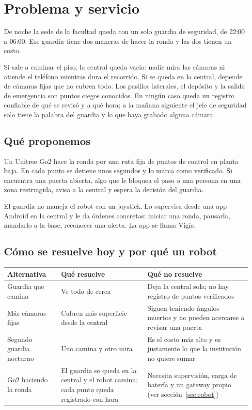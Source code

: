 \section{Problema y servicio}
\label{sec:problema}

De noche la sede de la facultad queda con un solo guardia de seguridad, de 22:00 a 06:00. Ese guardia tiene dos maneras de hacer la ronda y las dos tienen un costo.

Si sale a caminar el piso, la central queda vacía: nadie mira las cámaras ni atiende el teléfono mientras dura el recorrido. Si se queda en la central, depende de cámaras fijas que no cubren todo. Los pasillos laterales, el depósito y la salida de emergencia son puntos ciegos conocidos. En ningún caso queda un registro confiable de qué se revisó y a qué hora; a la mañana siguiente el jefe de seguridad solo tiene la palabra del guardia y lo que haya grabado alguna cámara.

\subsection{Qué proponemos}

Un Unitree Go2 hace la ronda por una ruta fija de puntos de control en planta baja. En cada punto se detiene unos segundos y lo marca como verificado. Si encuentra una puerta abierta, algo que le bloquea el paso o una persona en una zona restringida, avisa a la central y espera la decisión del guardia.

El guardia no maneja el robot con un joystick. Lo supervisa desde una app Android en la central y le da órdenes concretas: iniciar una ronda, pausarla, mandarlo a la base, reconocer una alerta. La app se llama Vigía.

\subsection{Cómo se resuelve hoy y por qué un robot}

\begin{table}[H]
\centering\small
\begin{tabularx}{\textwidth}{@{}l L L@{}}
\toprule
\textbf{Alternativa} & \textbf{Qué resuelve} & \textbf{Qué no resuelve} \\
\midrule
Guardia que camina & Ve todo de cerca & Deja la central sola; no hay registro de puntos verificados \\
Más cámaras fijas & Cubren más superficie desde la central & Siguen teniendo ángulos muertos y no pueden acercarse a revisar una puerta \\
Segundo guardia nocturno & Uno camina y otro mira & Es el costo más alto y es justamente lo que la institución no quiere sumar \\
Go2 haciendo la ronda & El guardia se queda en la central y el robot camina; cada punto queda registrado con hora & Necesita supervisión, carga de batería y un gateway propio (ver sección~\ref{sec:robot}) \\
\bottomrule
\end{tabularx}
\end{table}

